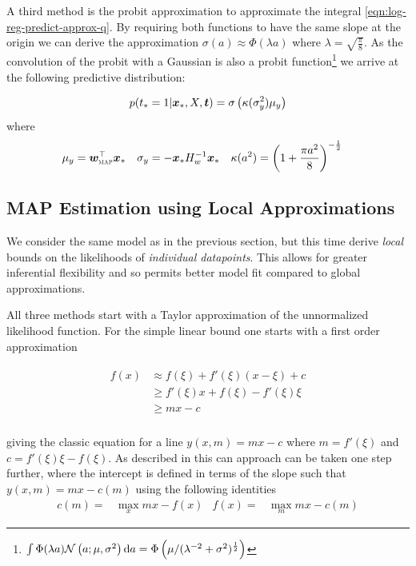 A third method is the probit approximation\cite{Barber1998} to approximate the integral \eqref{eqn:log-reg-predict-approx-q}. By requiring both functions to have the same slope at the origin we can derive the approximation $\sigma(a) \approx \Phi(\lambda a)$ where $\lambda = \sqrt{\frac{\pi}{8}}$. As the convolution of the probit with a Gaussian is also a probit function\footnote{$\int \Phi(\lambda a)\mathcal{N} \left(a; \mu, \sigma^2\right) \text{d}a = \Phi\left(\mu / (\lambda^{-2} + \sigma^2)^{\frac{1}{2}} \right)$} we arrive at the following predictive distribution:


\begin{align}
p(t_* = 1 | \bm x_*, X, \bm t) = \sigma\left( \kappa(\sigma_y^2) \mu_y \right)
\end{align}
where
\begin{align}
\mu_y       & = \bm w_{\text{\tiny \sc MAP}}^\top\bm x_* &
\sigma_y    & = -\bm x_* {H}^{-1}_{w} \bm x_* &
\kappa(a^2) & = \left( 1 + \frac{\pi a^2}{8}  \right)^{-\frac{1}{2}}
\end{align}

\subsection*{MAP Estimation using Local Approximations}

We consider the same model as in the previous section, but this time derive \emph{local} bounds on the likelihoods of \emph{individual datapoints}. This allows for greater inferential flexibility and so permits better model fit compared to global approximations\cite{Jaakkola1997}.

All three methods start with a Taylor approximation of the unnormalized likelihood function. For the simple linear bound one starts with a first order approximation

\begin{align}
\begin{split}
f(x) & \approx f(\xi) + f'(\xi) (x - \xi) + c \\
 & \geq f'(\xi) x + f(\xi) - f'(\xi)\xi \\
 & \geq m x - c \\
\end{split}
\end{align}

giving the classic equation for a line $y(x, m) = mx - c$ where $m = f'(\xi)$ and $c = f'(\xi)\xi - f(\xi)$. As described in \cite{JordanBook1999} this can approach can be taken one step further, where the intercept is defined in terms of the slope such that $y(x, m) = mx - c(m)$ using the following identities
\begin{align}
c(m) = & \max _x mx - f(x) & f(x) = & \max _m mx - c(m)
\end{align}

